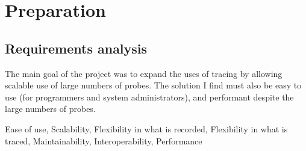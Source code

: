 \chapter{Preparation}
 
\iffalse
Even before writing the project proposal my supervisor and I agreed that the best way to make a tracing system that can trace many call instructions and supports programmable event handlers is to add support for eBPF programs to kamprobes. Given that kamprobes already do a good job of tracing a large number of instruction calls, recreating the mechanism they use would be needlessly repeating work.
\fi

\section {Requirements analysis} 
    The main goal of the project was to expand the uses of tracing by allowing scalable use of large numbers of probes. The solution I find must also be easy to use (for programmers and system administrators), and performant despite the large numbers of probes.

    Ease of use, Scalability, Flexibility in what is recorded, Flexibility in what is traced, Maintainability, Interoperability, Performance
    
